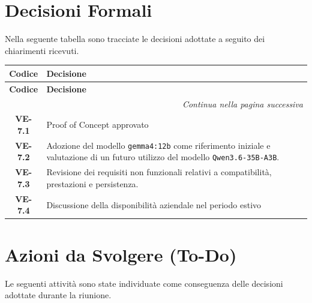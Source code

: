 \section{Decisioni Formali}
Nella seguente tabella sono tracciate le decisioni adottate a seguito
dei chiarimenti ricevuti.

\renewcommand{\arraystretch}{1.3}
\vspace{-0.3cm}
\noindent
\begin{longtable}{c p{12cm}}
	\toprule
	\textbf{Codice} & \textbf{Decisione} \\
	\midrule
	\endfirsthead

	\toprule
	\textbf{Codice} & \textbf{Decisione} \\
	\midrule
	\endhead

	\midrule
	\multicolumn{2}{r}{\textit{Continua nella pagina successiva}} \\
	\midrule
	\endfoot

	\bottomrule
	\endlastfoot

	\textbf{VE-7.1}
		& Proof of Concept approvato \\[4pt]

	\textbf{VE-7.2}
		& Adozione del modello \texttt{gemma4:12b} come riferimento iniziale e valutazione di un futuro utilizzo del modello \texttt{Qwen3.6-35B-A3B}.  \\[4pt]

	\textbf{VE-7.3}
		& Revisione dei requisiti non funzionali relativi a compatibilità, prestazioni e persistenza. \\[4pt]

	\textbf{VE-7.4}
		& Discussione della disponibilità aziendale nel periodo estivo \\[4pt]
\end{longtable}

\newpage
\section{Azioni da Svolgere (To-Do)}

Le seguenti attività sono state individuate come conseguenza
delle decisioni adottate durante la riunione.

